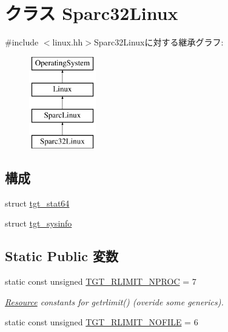 \hypertarget{classSparc32Linux}{
\section{クラス Sparc32Linux}
\label{classSparc32Linux}
}


{\ttfamily \#include $<$linux.hh$>$}Sparc32Linuxに対する継承グラフ:\begin{figure}[H]
\begin{center}
\leavevmode
\includegraphics[height=4cm]{classSparc32Linux}
\end{center}
\end{figure}
\subsection*{構成}
\begin{DoxyCompactItemize}
\item 
struct \hyperlink{structSparc32Linux_1_1tgt__stat64}{tgt\_\-stat64}
\item 
struct \hyperlink{structSparc32Linux_1_1tgt__sysinfo}{tgt\_\-sysinfo}
\end{DoxyCompactItemize}
\subsection*{Static Public 変数}
\begin{DoxyCompactItemize}
\item 
static const unsigned \hyperlink{classSparc32Linux_af16b609dcc51ebef365e8258e28d777c}{TGT\_\-RLIMIT\_\-NPROC} = 7
\begin{DoxyCompactList}\small\item\em \hyperlink{classResource}{Resource} constants for getrlimit() (overide some generics). \item\end{DoxyCompactList}\item 
static const unsigned \hyperlink{classSparc32Linux_a7eca1a56bf2a00dce74320c95a0b176e}{TGT\_\-RLIMIT\_\-NOFILE} = 6
\end{DoxyCompactItemize}


